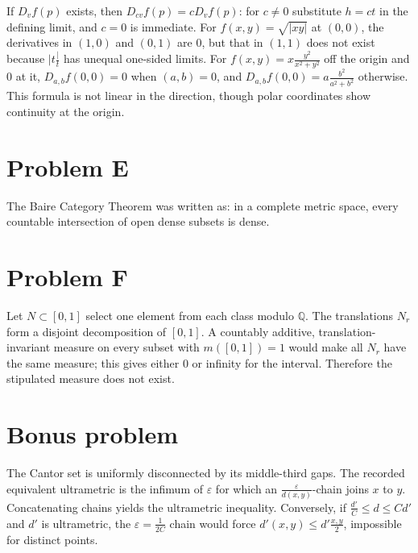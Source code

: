 If \(D_{v}f(p)\) exists, then \(D_{cv}f(p) = cD_{v}f(p)\): for \(c \neq 0\) substitute \(h = ct\) in the defining limit, and \(c = 0\) is immediate. For \(f\left( {x,y} \right) = \sqrt{|xy|}\) at \(\left( {0,0} \right)\), the derivatives in \(\left( {1,0} \right)\) and \(\left( {0,1} \right)\) are \(0\), but that in \(\left( {1,1} \right)\) does not exist because \(|t\frac{|}{t}\) has unequal one-sided limits. For \(f\left( {x,y} \right) = x\frac{y^{2}}{x^{2} + y^{2}}\) off the origin and \(0\) at it, \(D_{a,b}f\left( {0,0} \right) = 0\) when \(\left( {a,b} \right) = 0\), and \(D_{a,b}f\left( {0,0} \right) = a\frac{b^{2}}{a^{2} + b^{2}}\) otherwise. This formula is not linear in the direction, though polar coordinates show continuity at the origin.

\section{Problem E}

The Baire Category Theorem was written as: in a complete metric space, every countable intersection of open dense subsets is dense.

\section{Problem F}

Let \(N \subset \left\lbrack {0,1} \right\rbrack\) select one element from each class modulo \(\mathbb{Q}\). The translations \(N_{r}\) form a disjoint decomposition of \(\left\lbrack {0,1} \right\rbrack\). A countably additive, translation-invariant measure on every subset with \(m\left( \left\lbrack {0,1} \right\rbrack \right) = 1\) would make all \(N_{r}\) have the same measure; this gives either \(0\) or infinity for the interval. Therefore the stipulated measure does not exist.

\section{Bonus problem}

The Cantor set is uniformly disconnected by its middle-third gaps. The recorded equivalent ultrametric is the infimum of \(\varepsilon\) for which an \(\frac{\varepsilon}{d\left( {x,y} \right)}\)-chain joins \(x\) to \(y\). Concatenating chains yields the ultrametric inequality. Conversely, if \(\frac{d'}{C} \leq d \leq Cd'\) and \(d'\) is ultrametric, the \(\varepsilon = \frac{1}{2C}\) chain would force \(d'\left( {x,y} \right) \leq d'\frac{x,y}{2}\), impossible for distinct points.
